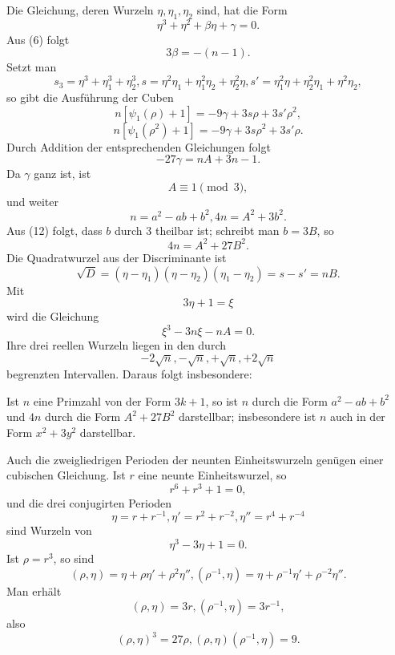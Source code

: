 \documentclass[11pt]{article}
\begin{document}
Die Gleichung, deren Wurzeln $\eta,
\eta_1,
\eta_2$ sind, hat die Form
\[
        \eta^3+
\eta^2+
\beta\eta+
\gamma=0.                          \tag{8}
\]
Aus (6) folgt
\[
        3\beta=-(n-1).                                                   \tag{9}
\]
Setzt man
\[
        s_3=\eta^3+
\eta_1^3+
\eta_2^3,
        s=\eta^2\eta_1+
\eta_1^2\eta_2+
\eta_2^2\eta,
        s'=\eta_1^2\eta+
\eta_2^2\eta_1+
\eta^2\eta_2,
\]
so gibt die Ausführung der Cuben
\[
        n[\psi_1(\rho)+1]=-9\gamma+3s\rho+3s'\rho^2,                  \tag{10}
\]
\[
        n[\psi_1(\rho^2)+1]=-9\gamma+3s\rho^2+3s'\rho.                \tag{11}
\]
Durch Addition der entsprechenden Gleichungen folgt
\[
        -27\gamma=nA+3n-1.                                             \tag{12}
\]
Da $\gamma$ ganz ist, ist
\[
        A\equiv1\pmod3,                                                \tag{13}
\]
und weiter
\[
        n=a^2-ab+b^2,
        4n=A^2+3b^2.                                                   \tag{14}
\]
Aus (12) folgt, dass $b$ durch $3$ theilbar ist; schreibt man $b=3B$, so
\[
        4n=A^2+27B^2.                                                  \tag{15}
\]
Die Quadratwurzel aus der Discriminante ist
\[
        \sqrt D=(\eta-
\eta_1)(\eta-
\eta_2)(\eta_1-
\eta_2)=s-s'=nB.             \tag{16}
\]
Mit
\[
        3\eta+1=\xi
\]
wird die Gleichung
\[
        \xi^3-3n\xi-nA=0.                                              \tag{17}
\]
Ihre drei reellen Wurzeln liegen in den durch
\[
        -2\sqrt n,
        -\sqrt n,
        +\sqrt n,
        +2\sqrt n                                                     \tag{18}
\]
begrenzten Intervallen. Daraus folgt insbesondere:

Ist $n$ eine Primzahl von der Form $3k+1$, so ist $n$ durch die Form $a^2-ab+b^2$ und $4n$ durch die Form $A^2+27B^2$ darstellbar; insbesondere ist $n$ auch in der Form $x^2+3y^2$ darstellbar.

Auch die zweigliedrigen Perioden der neunten Einheitswurzeln genügen einer cubischen Gleichung. Ist $r$ eine neunte Einheitswurzel, so
\[
        r^6+r^3+1=0,                                                    \tag{19}
\]
und die drei conjugirten Perioden
\[
        \eta=r+r^{-1},
        \eta'=r^2+r^{-2},
        \eta''=r^4+r^{-4}                                               \tag{20}
\]
sind Wurzeln von
\[
        \eta^3-3\eta+1=0.                                                \tag{21}
\]
Ist $\rho=r^3$, so sind
\[
        (\rho,
\eta)=\eta+
\rho\eta'+
\rho^2\eta'',
        (\rho^{-1},
\eta)=\eta+
\rho^{-1}\eta'+
\rho^{-2}\eta''.                         \tag{22}
\]
Man erhält
\[
        (\rho,
\eta)=3r,
        (\rho^{-1},
\eta)=3r^{-1},
\]
also
\[
        (\rho,
\eta)^3=27\rho,
        (\rho,
\eta)(\rho^{-1},
\eta)=9.                              \tag{23}
\]
\end{document}

